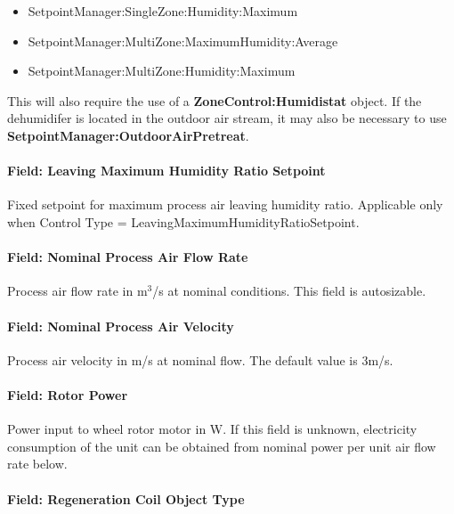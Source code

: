 \begin{itemize}
\item
  SetpointManager:SingleZone:Humidity:Maximum
\item
  SetpointManager:MultiZone:MaximumHumidity:Average
\item
  SetpointManager:MultiZone:Humidity:Maximum
\end{itemize}

This will also require the use of a \textbf{ZoneControl:Humidistat} object. If the dehumidifer is located in the outdoor air stream, it may also be necessary to use \textbf{SetpointManager:OutdoorAirPretreat}.

\paragraph{Field: Leaving Maximum Humidity Ratio Setpoint}\label{field-leaving-maximum-humidity-ratio-setpoint}

Fixed setpoint for maximum process air leaving humidity ratio. Applicable only when Control Type = LeavingMaximumHumidityRatioSetpoint.

\paragraph{Field: Nominal Process Air Flow Rate}\label{field-nominal-process-air-flow-rate}

Process air flow rate in m\(^{3}\)/s at nominal conditions. This field is autosizable.

\paragraph{Field: Nominal Process Air Velocity}\label{field-nominal-process-air-velocity}

Process air velocity in m/s at nominal flow. The default value is 3m/s.

\paragraph{Field: Rotor Power}\label{field-rotor-power}

Power input to wheel rotor motor in W. If this field is unknown, electricity consumption of the unit can be obtained from nominal power per unit air flow rate below.

\paragraph{Field: Regeneration Coil Object Type}\label{field-regeneration-coil-object-type}

